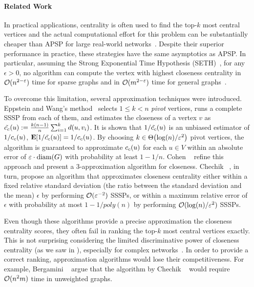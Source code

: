 \paragraph{Related Work} In practical applications, centrality is often used to
find the top-$k$ most central vertices and the actual computational effort for
this problem can be substantially cheaper than APSP for large real-world
networks~\cite{DBLP:journals/tkdd/BergaminiBCMM19,DBLP:conf/icde/OlsenLH14}.
%
Despite their superior performance in practice, these strategies have the same
asymptotics as APSP. In particular, assuming the Strong Exponential Time
Hypothesis (SETH)~\cite{DBLP:journals/jcss/ImpagliazzoPZ01}, for any
$\epsilon > 0$, no algorithm can compute the vertex with highest closeness
centrality in $\mathcal{O}(n^{2 - \varepsilon})$ time for sparse graphs and in $\mathcal{O}(m^{2 -
\varepsilon})$ time for general graphs~\cite{DBLP:conf/soda/AbboudWW16}.

To overcome this limitation,
several approximation techniques were introduced.
Eppstein and Wang's method~\cite{DBLP:journals/jgaa/EppsteinW04}
selects $1 \le k < n$ \emph{pivot} vertices, runs a complete SSSP
from each of them, and estimates the closeness of a vertex $v$
as $\tilde{c_c}(u) := \frac{k (n - 1)}{n}\sum_{i = 1}^k d(u, v_i)$. It is shown that
$1/\tilde{c_c}(u)$ is an unbiased estimator of $1/c_c(u)$, \ie
$\expected{1/\tilde{\clos}(u)} = 1/\clos(u)$.
By choosing $k \in \Theta\roundb{\log(n)/\epsilon^2}$ pivot vertices, the
algorithm is guaranteed to approximate $c_c(u)$ for each $u \in V$ within an
absolute error of $\varepsilon\cdot\text{diam}(G)$ with probability at least $1 - 1/n$.
Cohen \etal~\cite{DBLP:conf/cosn/CohenDPW14} refine this approach and present a
3-approximation algorithm for closeness. Chechik
\etal~\cite{DBLP:conf/approx/ChechikCK15}, in turn, propose an algorithm that
approximates closeness centrality either within a fixed relative standard deviation
(\ie the ratio between the standard deviation and the mean)
$\epsilon$ by performing $\mathcal{O}(\varepsilon^{-2})$ SSSPs, or within a maximum
relative error of $\epsilon$ with probability at most $1 - 1/poly(n)$ by
performing $\mathcal{O}(\log(n) / \varepsilon^2)$ SSSPs.

Even though these algorithms provide a precise approximation the closeness
centrality scores, they often fail in ranking the top-$k$ most central vertices
exactly. This is not surprising considering the limited discriminative power of
closeness centrality (as we saw in ),
especially for complex networks~\cite[Ch. 7]{newman2018networks}. In order
to provide a correct ranking, approximation
algorithms would lose their competitiveness. For example, Bergamini
\etal~\cite{DBLP:journals/tkdd/BergaminiBCMM19} argue that the algorithm by
Chechik \etal~\cite{DBLP:conf/approx/ChechikCK15} would require $\mathcal{O}(n^2m)$
time in unweighted graphs.

